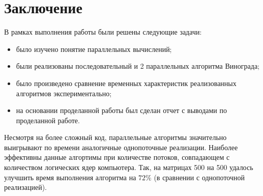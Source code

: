 \chapter*{Заключение}

В рамках выполнения работы были решены следующие задачи:
\begin{itemize}
	\item было изучено понятие параллельных вычислений;
    \item были реализованы последовательный и 2 параллельных алгоритма Винограда;
	\item было произведено сравнение временных характеристик реализованных алгоритмов экспериментально;
	\item на основании проделанной работы был сделан отчет с выводами по проделанной работе.
\end{itemize}

Несмотря на более сложный код, параллельные алгоритмы значительно выигрывают по времени аналогичные однопоточные реализации. Наиболее эффективны данные алгортимы при количестве потоков, совпадающем с количеством логических ядер компьютера. Так, на матрицах 500 на 500 удалось улучшить время выполнения алгоритма на $72\%$ (в сравнении с однопоточной реализацией).
